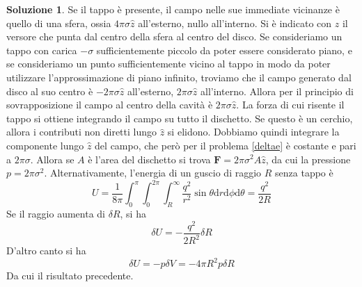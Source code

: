 \documentclass[a4paper,11pt]{book}
\newcommand{\dif}{\mathrm{d}}
\renewcommand{\vec}[1]{\mathbf{#1}}
\theoremstyle{theorem}
\theoremstyle{definition}
\newtheorem{soluzione}{Soluzione}[section]
\begin{document}
\begin{soluzione}
	Se il tappo è presente, il campo nelle sue immediate vicinanze è quello di una sfera, ossia $4\pi\sigma\hat{z}$ all'esterno, nullo all'interno. Si è indicato con $\hat{z}$ il versore che punta dal centro della sfera al centro del disco. Se consideriamo un tappo con carica $-\sigma$ sufficientemente piccolo da poter essere considerato piano, e se consideriamo un punto sufficientemente vicino al tappo in modo da poter utilizzare l'approssimazione di piano infinito, troviamo che il campo generato dal disco al suo centro è $-2\pi\sigma\hat{z}$ all'esterno, $2\pi\sigma\hat{z}$ all'interno. Allora per il principio di sovrapposizione il campo al centro della cavità è $2\pi\sigma\hat{z}$. La forza di cui risente il tappo si ottiene integrando il campo su tutto il dischetto. Se questo è un cerchio, allora i contributi non diretti lungo $\hat{z}$  si elidono. Dobbiamo quindi integrare la componente lungo $\hat{z}$ del campo, che però per il problema \ref{deltae} è costante e pari a $2\pi\sigma$. Allora se $A$ è l'area del dischetto si trova $\vec{F}=2\pi\sigma^2A\hat{z}$, da cui la pressione $p=2\pi\sigma^2$. Alternativamente, l'energia di un guscio di raggio $R$ senza tappo è
	\[U=\frac{1}{8\pi}\int_{0}^{\pi}\int_{0}^{2\pi}\int_{R}^{\infty}\frac{q^2}{r^2}\sin\theta\dif r\dif\phi\dif\theta=\frac{q^2}{2R}\]
	Se il raggio aumenta di $\delta R$, si ha
	\[\delta U=-\frac{q^2}{2R^2}\delta R\]
	D'altro canto si ha
	\[\delta U=-p\delta V=-4\pi R^2p\delta R\]
	Da cui il risultato precedente.
\end{soluzione}
\newpage
\end{document}
